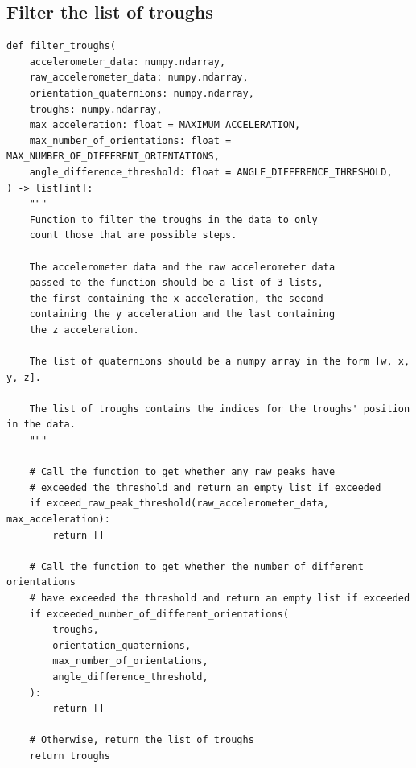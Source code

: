 \documentclass[12pt]{report}
\begin{document}
\subsection{Filter the list of troughs}
\label{sec:org437fea9}
\begin{verbatim}
def filter_troughs(
    accelerometer_data: numpy.ndarray,
    raw_accelerometer_data: numpy.ndarray,
    orientation_quaternions: numpy.ndarray,
    troughs: numpy.ndarray,
    max_acceleration: float = MAXIMUM_ACCELERATION,
    max_number_of_orientations: float = MAX_NUMBER_OF_DIFFERENT_ORIENTATIONS,
    angle_difference_threshold: float = ANGLE_DIFFERENCE_THRESHOLD,
) -> list[int]:
    """
    Function to filter the troughs in the data to only
    count those that are possible steps.

    The accelerometer data and the raw accelerometer data
    passed to the function should be a list of 3 lists,
    the first containing the x acceleration, the second
    containing the y acceleration and the last containing
    the z acceleration.

    The list of quaternions should be a numpy array in the form [w, x, y, z].

    The list of troughs contains the indices for the troughs' position in the data.
    """

    # Call the function to get whether any raw peaks have
    # exceeded the threshold and return an empty list if exceeded
    if exceed_raw_peak_threshold(raw_accelerometer_data, max_acceleration):
        return []

    # Call the function to get whether the number of different orientations
    # have exceeded the threshold and return an empty list if exceeded
    if exceeded_number_of_different_orientations(
        troughs,
        orientation_quaternions,
        max_number_of_orientations,
        angle_difference_threshold,
    ):
        return []

    # Otherwise, return the list of troughs
    return troughs
\end{verbatim}
\end{document}
